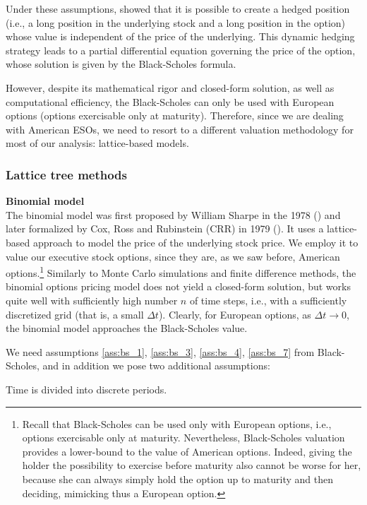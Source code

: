     Under these assumptions, \cite{black1973pricing} showed that it is possible to create a hedged position (i.e., a long position in the underlying stock and a long position in the option) whose value is independent of the price of the underlying. This dynamic hedging strategy leads to a partial differential equation governing the price of the option, whose solution is given by the Black-Scholes formula.

    However, despite its mathematical rigor and closed-form solution, as well as computational efficiency, the Black-Scholes can only be used with European options (options exercisable only at maturity). Therefore, since we are dealing with American ESOs, we need to resort to a different valuation methodology for most of our analysis: lattice-based models.

\subsubsection*{Lattice tree methods} 
\textbf{Binomial model}\\
The binomial model was first proposed by William Sharpe in the 1978 (\cite{sharpe1978investments}) and later formalized by Cox, Ross and Rubinstein (CRR) in 1979 (\cite{cox1979option}). It uses a lattice-based approach to model the price of the underlying stock price. We employ it to value our executive stock options, since they are, as we saw before, American options.\footnote{Recall that Black-Scholes can be used only with European options, i.e., options exercisable only at maturity. Nevertheless, Black-Scholes valuation provides a lower-bound to the value of American options. Indeed, giving the holder the possibility to exercise before maturity also cannot be worse for her, because she can always simply hold the option up to maturity and then deciding, mimicking thus a European option.}
Similarly to Monte Carlo simulations and finite difference methods, the binomial options pricing model does not yield a closed-form solution, but works quite well with sufficiently high number $n$ of time steps, i.e., with a sufficiently discretized grid (that is, a small $\Delta t$). Clearly, for European options, as $\Delta t \rightarrow 0$, the binomial model approaches the Black-Scholes value.

We need assumptions \ref*{ass:bs_1}, \ref*{ass:bs_3}, \ref*{ass:bs_4}, \ref*{ass:bs_7} from Black-Scholes, and in addition we pose two additional assumptions:

\begin{assumption}
    \label{ass:bin_8}
    Time is divided into discrete periods.
\end{assumption}

